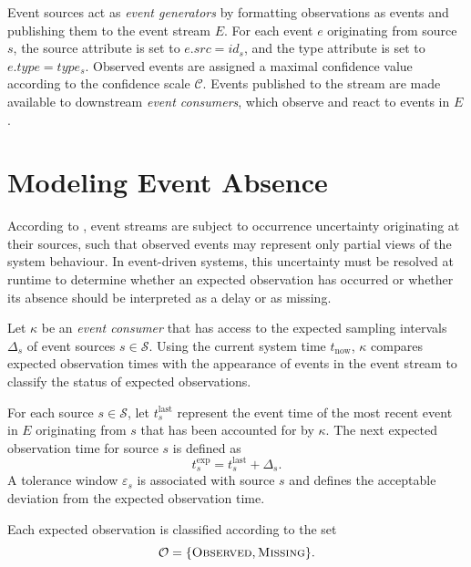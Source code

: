 Event sources act as \emph{event generators} by formatting observations as events and publishing them to the event stream $E$. For each event $e$ originating from source $s$, the source attribute is set to $e.src = id_s$, and the type attribute is set to $e.type = type_s$. Observed events are assigned a maximal confidence value according to the confidence scale $\mathcal{C}$.
Events published to the stream are made available to downstream \emph{event consumers}, which observe and react to events in $E$.


\section{Modeling Event Absence}
\label{sec:scheduling-missing}

According to \citet{wasserkrug2006taxonomy}, event streams are subject to occurrence uncertainty originating at their sources, such that observed events may represent only partial views of the system behaviour. In event-driven systems, this uncertainty must be resolved at runtime to determine whether an expected observation has occurred or whether its absence should be interpreted as a delay or as missing.

Let $\kappa$ be an \emph{event consumer} that has access to the expected sampling intervals $\Delta_s$ of event sources $s \in \mathcal{S}$. Using the current system time $t_{\mathrm{now}}$, $\kappa$ compares expected observation times with the appearance of events in the event stream to classify the status of expected observations.

For each source $s \in \mathcal{S}$, let $t^{\mathrm{last}}_s$ represent the event time of the most recent event in $E$ originating from $s$ that has been accounted for by $\kappa$. The next expected observation time for source $s$ is defined as
\begin{equation}
t^{\mathrm{exp}}_s = t^{\mathrm{last}}_s + \Delta_s .
\end{equation}
A tolerance window $\varepsilon_s$ is associated with source $s$ and defines the acceptable deviation from the expected observation time.

Each expected observation is classified according to the set
\begin{equation}
\mathcal{O} = \{\textsc{Observed}, \textsc{Missing}\}.
\end{equation}

